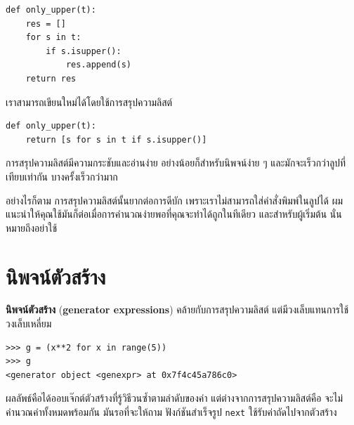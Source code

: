 \begin{verbatim}
def only_upper(t):
    res = []
    for s in t:
        if s.isupper():
            res.append(s)
    return res
\end{verbatim}

เราสามารถเขียนใหม่ได้โดยใช้การสรุปความลิสต์

\begin{verbatim}
def only_upper(t):
    return [s for s in t if s.isupper()]
\end{verbatim}

การสรุปความลิสต์มีความกระชับและอ่านง่าย อย่างน้อยก็สำหรับนิพจน์ง่าย ๆ และมักจะเร็วกว่าลูปที่เทียบเท่ากัน บางครั้งเร็วกว่ามาก 

อย่างไรก็ตาม การสรุปความลิสต์นั้นยากต่อการดีบัก เพราะเราไม่สามารถใส่คำสั่งพิมพ์ในลูปได้ ผมแนะนำให้คุณใช้มันก็ต่อเมื่อการคำนวณง่ายพอที่คุณจะทำได้ถูกในทีเดียว 
และสำหรับผู้เริ่มต้น นั่นหมายถึงอย่าใช้



\section{นิพจน์ตัวสร้าง} %

{\bf นิพจน์ตัวสร้าง} (\textbf{generator expressions}) คล้ายกับการสรุปความลิสต์ แต่มีวงเล็บแทนการใช้วงเล็บเหลี่ยม

\begin{verbatim}
>>> g = (x**2 for x in range(5))
>>> g
<generator object <genexpr> at 0x7f4c45a786c0>
\end{verbatim}
%
ผลลัพธ์คือได้ออบเจ๊กต์ตัวสร้างที่รู้วิธีวนซ้ำตามลำดับของค่า 
แต่ต่างจากการสรุปความลิสต์คือ จะไม่คำนวณค่าทั้งหมดพร้อมกัน 
มันรอที่จะให้ถาม ฟังก์ชันสำเร็จรูป {\tt next} ใช้รับค่าถัดไปจากตัวสร้าง

